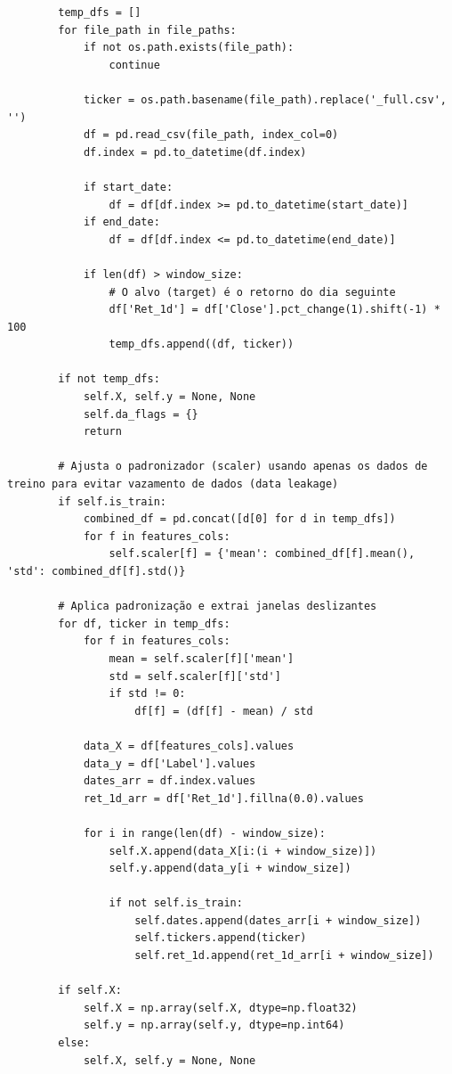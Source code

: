\documentclass{article}
\begin{document}
\begin{verbatim}
        temp_dfs = []
        for file_path in file_paths:
            if not os.path.exists(file_path): 
                continue
                
            ticker = os.path.basename(file_path).replace('_full.csv', '')
            df = pd.read_csv(file_path, index_col=0)
            df.index = pd.to_datetime(df.index)
            
            if start_date:
                df = df[df.index >= pd.to_datetime(start_date)]
            if end_date:
                df = df[df.index <= pd.to_datetime(end_date)]
                
            if len(df) > window_size:
                # O alvo (target) é o retorno do dia seguinte
                df['Ret_1d'] = df['Close'].pct_change(1).shift(-1) * 100
                temp_dfs.append((df, ticker))
        
        if not temp_dfs:
            self.X, self.y = None, None
            self.da_flags = {}
            return
            
        # Ajusta o padronizador (scaler) usando apenas os dados de treino para evitar vazamento de dados (data leakage)
        if self.is_train:
            combined_df = pd.concat([d[0] for d in temp_dfs])
            for f in features_cols:
                self.scaler[f] = {'mean': combined_df[f].mean(), 'std': combined_df[f].std()}
        
        # Aplica padronização e extrai janelas deslizantes
        for df, ticker in temp_dfs:
            for f in features_cols:
                mean = self.scaler[f]['mean']
                std = self.scaler[f]['std']
                if std != 0:
                    df[f] = (df[f] - mean) / std
                    
            data_X = df[features_cols].values
            data_y = df['Label'].values
            dates_arr = df.index.values
            ret_1d_arr = df['Ret_1d'].fillna(0.0).values
            
            for i in range(len(df) - window_size):
                self.X.append(data_X[i:(i + window_size)])
                self.y.append(data_y[i + window_size])
                
                if not self.is_train:
                    self.dates.append(dates_arr[i + window_size])
                    self.tickers.append(ticker)
                    self.ret_1d.append(ret_1d_arr[i + window_size])
                
        if self.X:
            self.X = np.array(self.X, dtype=np.float32)
            self.y = np.array(self.y, dtype=np.int64)
        else:
            self.X, self.y = None, None
            

\end{verbatim}
\end{document}
